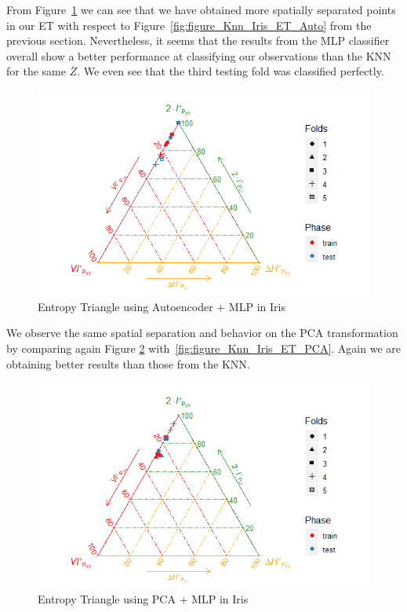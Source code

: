 From Figure~\ref{fig:figure_MLP_Iris_ET_Auto} we can see that we have obtained more spatially separated points in our ET with respect to Figure~\ref{fig:figure_Knn_Iris_ET_Auto} from the previous section. Nevertheless, it seems that the results from the MLP classifier overall show a better performance at classifying our observations than the KNN for the same $\overline{Z}$. We even see that the third testing fold was classified perfectly.
%
\begin{figure}[H]
	\includegraphics[width=\linewidth]{Figuras_tfg/ET_Iris_Auto_Mlp}
	\caption{Entropy Triangle using Autoencoder + MLP in Iris}
	\label{fig:figure_MLP_Iris_ET_Auto}
\end{figure}

We observe the same spatial separation and behavior on the PCA transformation by comparing again Figure \ref{fig:figure_MLP_Iris_ET_PCA} with~\ref{fig:figure_Knn_Iris_ET_PCA}. Again we are obtaining better results than those from the KNN.
%
\begin{figure}[H]
	
	\includegraphics[width=\linewidth]{Figuras_tfg/ET_Iris_Pca_Mlp}
	\caption{Entropy Triangle using PCA + MLP in Iris}
	\label{fig:figure_MLP_Iris_ET_PCA}
\end{figure}

